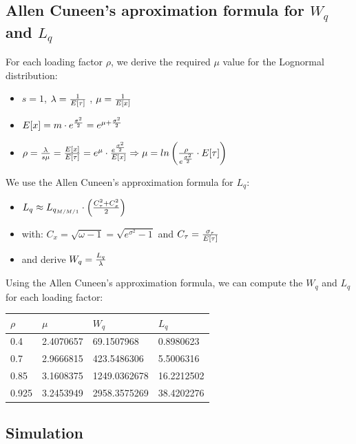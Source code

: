 \documentclass[]{article}
\providecommand{\tightlist}{%
  \setlength{\itemsep}{0pt}\setlength{\parskip}{0pt}}
\begin{document}
\subsection{\texorpdfstring{Allen Cuneen's aproximation formula for
\(W_{q}\) and
\(L_{q}\)}{Allen Cuneen's aproximation formula for W\_\{q\} and L\_\{q\}}}\label{allen-cuneens-aproximation-formula-for-w_q-and-l_q}

For each loading factor \(\rho\), we derive the required \(\mu\) value
for the Lognormal distribution:

\begin{itemize}
\tightlist
\item
  \(s = 1\), \(\lambda = { 1 \over E[\tau] }\) ,
  \(\mu = {1 \over E[x]}\)
\item
  \(E[x] = m \cdot e^{\sigma^{2} \over 2} = e^{\mu + {\sigma^{2} \over 2} }\)
\item
  \(\rho = { \lambda \over {s\mu}} = { E[x] \over E[\tau] } = e^{\mu} \cdot { e^{\sigma^{2} \over 2} \over E[x] } \Rightarrow \mu = ln \left( { \rho \over e^{ \sigma^{2} \over 2 } } \cdot E[\tau] \right)\)
\end{itemize}

We use the Allen Cuneen's approximation formula for \(L_{q}\):

\begin{itemize}
\tightlist
\item
  \(L_{q} \approx L_{q_{M/M/1}} \cdot \left( C_{\tau}^{2} + C_{x}^{2} \over 2 \right)\)
\item
  with: \(C_{x} = \sqrt{ \omega - 1} = \sqrt{ e^{\sigma^{2}} - 1}\) and
  \(C_{\tau} = { \sigma_{\tau} \over E[\tau] }\)
\item
  and derive \(W_{q} = { L_{q} \over \lambda }\)
\end{itemize}

Using the Allen Cuneen's approximation formula, we can compute the
\(W_{q}\) and \(L_{q}\) for each loading factor:

\begin{longtable}[]{@{}llll@{}}
\toprule
\(\rho\) & \(\mu\) & \(W_{q}\) & \(L_{q}\)\tabularnewline
\midrule
\endhead
0.4 & 2.4070657 & 69.1507968 & 0.8980623\tabularnewline
0.7 & 2.9666815 & 423.5486306 & 5.5006316\tabularnewline
0.85 & 3.1608375 & 1249.0362678 & 16.2212502\tabularnewline
0.925 & 3.2453949 & 2958.3575269 & 38.4202276\tabularnewline
\bottomrule
\end{longtable}

\subsection{Simulation}\label{simulation}
\end{document}
